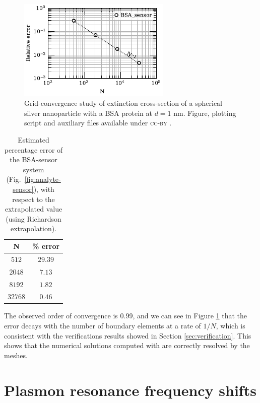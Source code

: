 \begin{figure}%
    \centering
    \includegraphics[width=0.65\textwidth]{convergence_bsa_sensor_R8_d1_w380.pdf} 
    \caption{Grid-convergence study of extinction cross-section of a spherical silver
             nanoparticle with a BSA protein at $d=1$ nm. 
             Figure, plotting script and auxiliary files available 
             under \textsc{cc-by} \cite{ClementiETal2018c}.}
    \label{fig:err_sph-bsa}
 \end{figure}

 \begin{table}%
    \centering
    \caption{\label{table:err_sph-bsa} Estimated percentage error of the BSA-sensor 
    system (Fig.~\ref{fig:analyte-sensor}), with respect to the extrapolated value 
    (using Richardson extrapolation).} 
    \begin{tabular}{c c}
    \hline%
    N & \% error \\
    \hline%
     $512$ & $29.39$ \\
     $2048$ & $7.13$ \\
     $8192$ & $1.82$ \\
     $32768$ & $0.46$ \\
    \hline%
    \end{tabular}
\end{table}

The observed order of convergence is 0.99, and we can see in Figure
\ref{fig:err_sph-bsa} that the error decays with the number of boundary elements
at a rate of $1/N$, which is consistent with the verifications results showed
in Section \ref{sec:verification}. This shows that the numerical solutions computed
with \pygbe are correctly resolved by the meshes.

\section{Plasmon resonance frequency shifts} \label{sec:shift_bsa}

